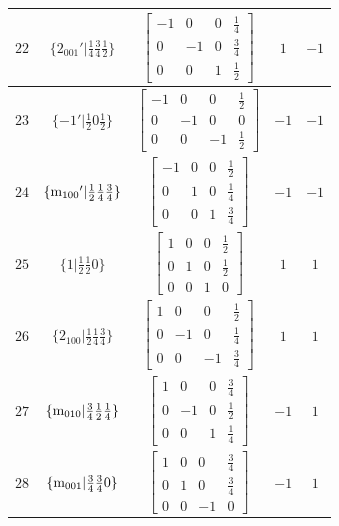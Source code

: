 \documentclass[fleqn,8pt]{jsarticle}
\begin{document}
\begin{longtable}{ccccc}
$ 22 $ & $ \{2{}_{001}{}'|\frac{1}{4} \frac{3}{4} \frac{1}{2}\} $ & $ \begin{bmatrix} -1 & 0 & 0 & \frac{1}{4} \\ 0 & -1 & 0 & \frac{3}{4} \\ 0 & 0 & 1 & \frac{1}{2} \end{bmatrix} $ & $ 1 $ & $ -1 $ \\ \hline
$ 23 $ & $ \{-1{}'|\frac{1}{2} 0 \frac{1}{2}\} $ & $ \begin{bmatrix} -1 & 0 & 0 & \frac{1}{2} \\ 0 & -1 & 0 & 0 \\ 0 & 0 & -1 & \frac{1}{2} \end{bmatrix} $ & $ -1 $ & $ -1 $ \\ \hline
$ 24 $ & $ \{{\rm m}_{100}{}'|\frac{1}{2} \frac{1}{4} \frac{3}{4}\} $ & $ \begin{bmatrix} -1 & 0 & 0 & \frac{1}{2} \\ 0 & 1 & 0 & \frac{1}{4} \\ 0 & 0 & 1 & \frac{3}{4} \end{bmatrix} $ & $ -1 $ & $ -1 $ \\ \hline
$ 25 $ & $ \{1|\frac{1}{2} \frac{1}{2} 0\} $ & $ \begin{bmatrix} 1 & 0 & 0 & \frac{1}{2} \\ 0 & 1 & 0 & \frac{1}{2} \\ 0 & 0 & 1 & 0 \end{bmatrix} $ & $ 1 $ & $ 1 $ \\ \hline
$ 26 $ & $ \{2{}_{100}|\frac{1}{2} \frac{1}{4} \frac{3}{4}\} $ & $ \begin{bmatrix} 1 & 0 & 0 & \frac{1}{2} \\ 0 & -1 & 0 & \frac{1}{4} \\ 0 & 0 & -1 & \frac{3}{4} \end{bmatrix} $ & $ 1 $ & $ 1 $ \\ \hline
$ 27 $ & $ \{{\rm m}_{010}|\frac{3}{4} \frac{1}{2} \frac{1}{4}\} $ & $ \begin{bmatrix} 1 & 0 & 0 & \frac{3}{4} \\ 0 & -1 & 0 & \frac{1}{2} \\ 0 & 0 & 1 & \frac{1}{4} \end{bmatrix} $ & $ -1 $ & $ 1 $ \\ \hline
$ 28 $ & $ \{{\rm m}_{001}|\frac{3}{4} \frac{3}{4} 0\} $ & $ \begin{bmatrix} 1 & 0 & 0 & \frac{3}{4} \\ 0 & 1 & 0 & \frac{3}{4} \\ 0 & 0 & -1 & 0 \end{bmatrix} $ & $ -1 $ & $ 1 $ \\ \hline

\end{longtable}
\end{document}
